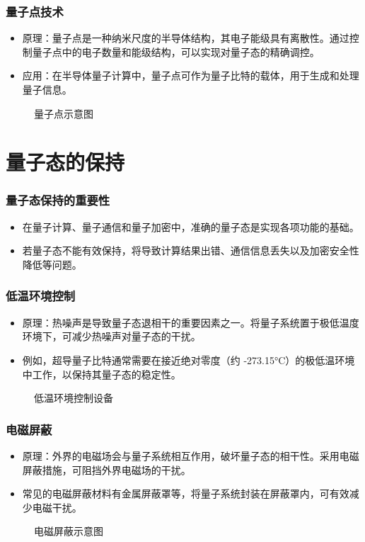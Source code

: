 \begin{frame}
    \frametitle{量子点技术}
    \begin{itemize}
        \item 原理：量子点是一种纳米尺度的半导体结构，其电子能级具有离散性。通过控制量子点中的电子数量和能级结构，可以实现对量子态的精确调控。
        \item 应用：在半导体量子计算中，量子点可作为量子比特的载体，用于生成和处理量子信息。
    \end{itemize}
    \begin{figure}
        \centering
        \caption{量子点示意图}
    \end{figure}
\end{frame}

\section{量子态的保持}
\begin{frame}
    \frametitle{量子态保持的重要性}
    \begin{itemize}
        \item 在量子计算、量子通信和量子加密中，准确的量子态是实现各项功能的基础。
        \item 若量子态不能有效保持，将导致计算结果出错、通信信息丢失以及加密安全性降低等问题。
    \end{itemize}
\end{frame}

\begin{frame}
    \frametitle{低温环境控制}
    \begin{itemize}
        \item 原理：热噪声是导致量子态退相干的重要因素之一。将量子系统置于极低温度环境下，可减少热噪声对量子态的干扰。
        \item 例如，超导量子比特通常需要在接近绝对零度（约 -273.15°C）的极低温环境中工作，以保持其量子态的稳定性。
    \end{itemize}
    \begin{figure}
        \centering
        \caption{低温环境控制设备}
    \end{figure}
\end{frame}

\begin{frame}
    \frametitle{电磁屏蔽}
    \begin{itemize}
        \item 原理：外界的电磁场会与量子系统相互作用，破坏量子态的相干性。采用电磁屏蔽措施，可阻挡外界电磁场的干扰。
        \item 常见的电磁屏蔽材料有金属屏蔽罩等，将量子系统封装在屏蔽罩内，可有效减少电磁干扰。
    \end{itemize}
    \begin{figure}
        \centering
        \caption{电磁屏蔽示意图}
    \end{figure}
\end{frame}

